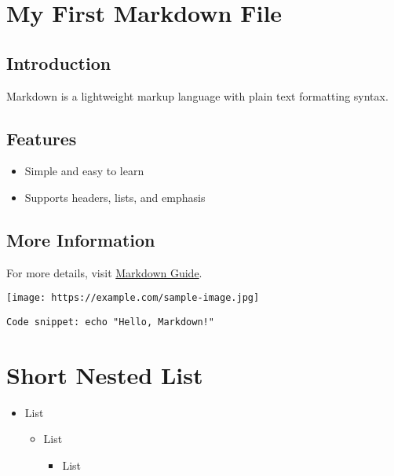 \documentclass{article}
\begin{document}
    \pagestyle{empty}

\section{My First Markdown File}


\subsection{Introduction}

Markdown is a lightweight markup language with plain text formatting syntax.


\subsection{Features}

\begin{itemize}
    \item Simple and easy to learn
    \item Supports headers, lists, and emphasis
\end{itemize}


\subsection{More Information}

For more details, visit \href{https://www.markdownguide.org/basic$\backslash$-syntax/}{Markdown Guide}.


\texttt{[image: https://example.com/sample-image.jpg]}


\texttt{Code snippet: echo "Hello, Markdown!"}


\section{Short Nested List}


\begin{itemize}
    \item List
\begin{itemize}
    \item List
\begin{itemize}
    \item List
\end{itemize}
\end{itemize}
\end{itemize}
\end{document}
